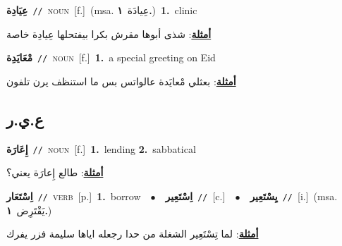 \documentclass[10pt,a4paper,twoside]{article} %
\begin{document}
\begin{multicols}{2}
{\setlength\topsep{0pt}\textbf{\foreignlanguage{arabic}{عِيَادِة}}\ {\color{gray}\texttt{//}\color{black}}\ \textsc{noun}\ [f.]\ \color{gray}(msa. \foreignlanguage{arabic}{عِيادَة}~\foreignlanguage{arabic}{\textbf{١.}})\color{black}\ \textbf{1.}~clinic\  \begin{flushright}\color{gray}\foreignlanguage{arabic}{\textbf{\underline{\foreignlanguage{arabic}{أمثلة}}}: شذى أبوها مقرش بكرا بيفتحلها عِيادِة خاصة}\end{flushright}\color{black}} \vspace{2mm}

{\setlength\topsep{0pt}\textbf{\foreignlanguage{arabic}{مْعَايَدِة}}\ {\color{gray}\texttt{//}\color{black}}\ \textsc{noun}\ [f.]\ \textbf{1.}~a special greeting on Eid\  \begin{flushright}\color{gray}\foreignlanguage{arabic}{\textbf{\underline{\foreignlanguage{arabic}{أمثلة}}}: بعثلي مْعايَدة عالواتس بس ما استنظف يرن تلفون}\end{flushright}\color{black}} \vspace{2mm}

\vspace{-3mm}
\subsection*{\color{blue}\foreignlanguage{arabic}{ع.ي.ر}\color{blue}{}} 

{\setlength\topsep{0pt}\textbf{\foreignlanguage{arabic}{إِعَارَة}}\ {\color{gray}\texttt{//}\color{black}}\ \textsc{noun}\ [f.]\ \textbf{1.}~lending  \textbf{2.}~sabbatical\  \begin{flushright}\color{gray}\foreignlanguage{arabic}{\textbf{\underline{\foreignlanguage{arabic}{أمثلة}}}: طالع إِعارَة يعني؟}\end{flushright}\color{black}} \vspace{2mm}

{\setlength\topsep{0pt}\textbf{\foreignlanguage{arabic}{اِسْتَعَار}}\ {\color{gray}\texttt{//}\color{black}}\ \textsc{verb}\ [p.]\ \textbf{1.}~borrow\ \ $\bullet$\ \ \setlength\topsep{0pt}\textbf{\foreignlanguage{arabic}{اِسْتَعِير}}\ {\color{gray}\texttt{//}\color{black}}\ [c.]\ \ $\bullet$\ \ \setlength\topsep{0pt}\textbf{\foreignlanguage{arabic}{يِسْتَعِير}}\ {\color{gray}\texttt{//}\color{black}}\ [i.]\ \color{gray}(msa. \foreignlanguage{arabic}{يَقْتَرِض}~\foreignlanguage{arabic}{\textbf{١.}})\color{black}\  \begin{flushright}\color{gray}\foreignlanguage{arabic}{\textbf{\underline{\foreignlanguage{arabic}{أمثلة}}}: لما تِسْتَعِير الشغلة من حدا رجعله اياها سليمة فزر يفرك}\end{flushright}\color{black}} \vspace{2mm}


\end{multicols}
\end{document}
